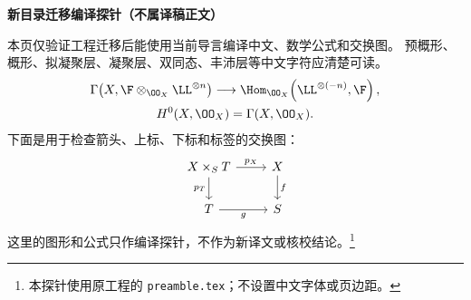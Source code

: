 

\pagestyle{plain}
\noindent\textbf{新目录迁移编译探针（不属译稿正文）}
\par\medskip
本页仅验证工程迁移后能使用当前导言编译中文、数学公式和交换图。
预概形、概形、拟凝聚层、凝聚层、双同态、丰沛层等中文字符应清楚可读。
\[
\begin{gathered}
 \Gamma\!\left(X,\F\otimes_{\OO_X}\LL^{\otimes n}\right)
 \longrightarrow
 \Hom_{\OO_X}\!\left(\LL^{\otimes(-n)},\F\right),
 \\
 H^0(X,\OO_X)=\Gamma(X,\OO_X).
\end{gathered}
\]
下面是用于检查箭头、上标、下标和标签的交换图：
\[
\begin{tikzcd}
 X\times_S T \arrow[r,"p_X"] \arrow[d,"p_T"'] & X \arrow[d,"f"]\\
 T \arrow[r,"g"'] & S
\end{tikzcd}
\]
这里的图形和公式只作编译探针，不作为新译文或核校结论。\footnote{本探针使用原工程的 \texttt{preamble.tex}；不设置中文字体或页边距。}

